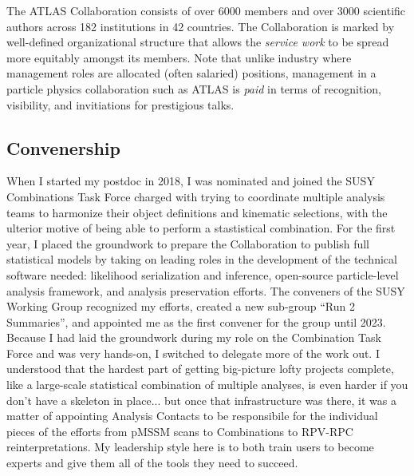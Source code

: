 The ATLAS Collaboration consists of over 6000 members and over 3000 scientific authors across 182 institutions in 42 countries. The Collaboration is marked by well-defined organizational structure that allows the \textsl{service work} to be spread more equitably amongst its members. Note that unlike industry where management roles are allocated (often salaried) positions, management in a particle physics collaboration such as ATLAS is \textsl{paid} in terms of recognition, visibility, and invitiations for prestigious talks.

\subsection{Convenership} \label{ssec:convenership}

When I started my postdoc in 2018, I was nominated and joined the SUSY Combinations Task Force charged with trying to coordinate multiple analysis teams to harmonize their object definitions and kinematic selections, with the ulterior motive of being able to perform a stastistical combination. For the first year, I placed the groundwork to prepare the Collaboration to publish full statistical models by taking on leading roles in the development of the technical software needed: likelihood serialization and inference, open-source particle-level analysis framework, and analysis preservation efforts. The conveners of the SUSY Working Group recognized my efforts, created a new sub-group \enquote{Run 2 Summaries}, and appointed me as the first convener for the group until 2023. Because I had laid the groundwork during my role on the Combination Task Force and was very hands-on, I switched to delegate more of the work out. I understood that the hardest part of getting big-picture lofty projects complete, like a large-scale statistical combination of multiple analyses, is even harder if you don't have a skeleton in place... but once that infrastructure was there, it was a matter of appointing Analysis Contacts to be responsibile for the individual pieces of the efforts from pMSSM scans to Combinations to RPV-RPC reinterpretations. My leadership style here is to both train users to become experts and give them all of the tools they need to succeed.

